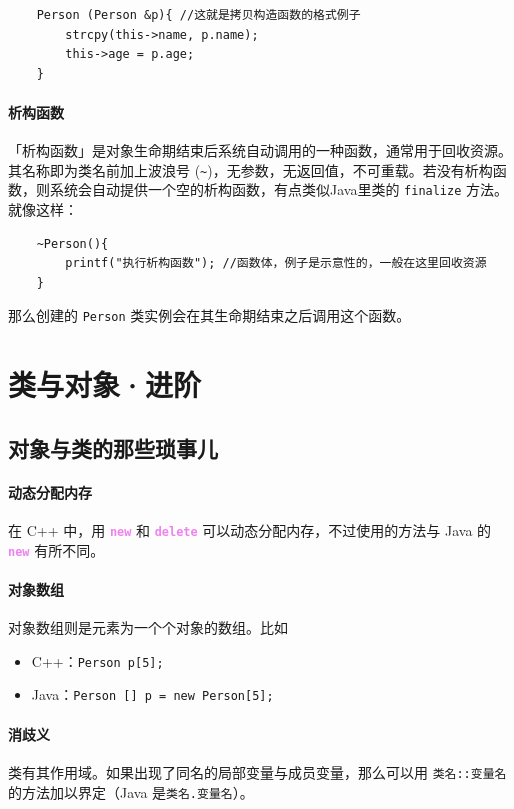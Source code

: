 \documentclass[UTF8]{ctexart}
\newcommand\keyword[1]{\textcolor{violet}{\textbf{\texttt{#1}}}}
\begin{document}
\begin{lstlisting}
    Person (Person &p){ //这就是拷贝构造函数的格式例子
        strcpy(this->name, p.name);
        this->age = p.age;
    }
\end{lstlisting}

\paragraph{析构函数} 「析构函数」是对象生命期结束后系统自动调用的一种函数，通常用于回收资源。其名称即为类名前加上波浪号 (\verb!~!)，无参数，无返回值，不可重载。若没有析构函数，则系统会自动提供一个空的析构函数，有点类似Java里类的 \verb!finalize! 方法。就像这样：

\begin{lstlisting}
    ~Person(){
		printf("执行析构函数"); //函数体，例子是示意性的，一般在这里回收资源
	}
\end{lstlisting}

那么创建的 \verb!Person! 类实例会在其生命期结束之后调用这个函数。

\section{类与对象·进阶}
\subsection{对象与类的那些琐事儿}
\paragraph{动态分配内存} 在 C++ 中，用 \keyword{new} 和 \keyword{delete} 可以动态分配内存，不过使用的方法与 Java 的 \keyword{new} 有所不同。

\paragraph{对象数组} 对象数组则是元素为一个个对象的数组。比如
\begin{itemize}[itemsep=0pt,parsep=0pt]
  \item C++：\verb!Person p[5];!
  \item Java：\verb!Person [] p = new Person[5];!
\end{itemize}

\paragraph{消歧义} 类有其作用域。如果出现了同名的局部变量与成员变量，那么可以用 \verb!类名::变量名! 的方法加以界定（Java 是\verb!类名.变量名!）。
\end{document}
